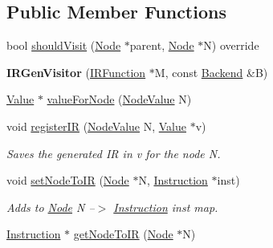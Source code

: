 \subsection*{Public Member Functions}
\begin{DoxyCompactItemize}
\item 
bool \hyperlink{classglow_1_1_i_r_gen_visitor_a5f5fe967edc74e4a65e5c4d76affac80}{should\+Visit} (\hyperlink{classglow_1_1_node}{Node} $\ast$parent, \hyperlink{classglow_1_1_node}{Node} $\ast$N) override
\item 
\mbox{\label{classglow_1_1_i_r_gen_visitor_aa8aff953d4f0ceafe3b8e5fd48590d0e}} 
{\bfseries I\+R\+Gen\+Visitor} (\hyperlink{classglow_1_1_i_r_function}{I\+R\+Function} $\ast$M, const \hyperlink{classglow_1_1_backend}{Backend} \&B)
\item 
\hyperlink{classglow_1_1_value}{Value} $\ast$ \hyperlink{classglow_1_1_i_r_gen_visitor_a34877f08e0fe9644b471d729a7924039}{value\+For\+Node} (\hyperlink{structglow_1_1_node_value}{Node\+Value} N)
\item 
\mbox{\label{classglow_1_1_i_r_gen_visitor_a6d0bf5fd1344ba86df0ec2d589d66937}} 
void \hyperlink{classglow_1_1_i_r_gen_visitor_a6d0bf5fd1344ba86df0ec2d589d66937}{register\+IR} (\hyperlink{structglow_1_1_node_value}{Node\+Value} N, \hyperlink{classglow_1_1_value}{Value} $\ast$v)
\begin{DoxyCompactList}\small\item\em Saves the generated IR in {\ttfamily v} for the node {\ttfamily N}. \end{DoxyCompactList}\item 
\mbox{\label{classglow_1_1_i_r_gen_visitor_a85300f2b9ee350ccd2b01200a1f09beb}} 
void \hyperlink{classglow_1_1_i_r_gen_visitor_a85300f2b9ee350ccd2b01200a1f09beb}{set\+Node\+To\+IR} (\hyperlink{classglow_1_1_node}{Node} $\ast$N, \hyperlink{classglow_1_1_instruction}{Instruction} $\ast$inst)
\begin{DoxyCompactList}\small\item\em Adds to \hyperlink{classglow_1_1_node}{Node} {\ttfamily N} --$>$ \hyperlink{classglow_1_1_instruction}{Instruction} {\ttfamily inst} map. \end{DoxyCompactList}\item 
\hyperlink{classglow_1_1_instruction}{Instruction} $\ast$ \hyperlink{classglow_1_1_i_r_gen_visitor_a53d9ffcdda8b598a40e95d139dc83f06}{get\+Node\+To\+IR} (\hyperlink{classglow_1_1_node}{Node} $\ast$N)

\end{DoxyCompactItemize}
